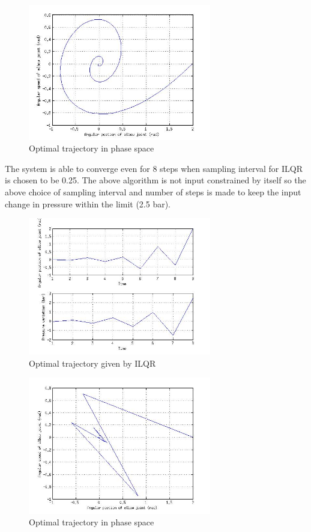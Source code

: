 \documentclass[conference]{IEEEtran}
\begin{document}
\begin{figure}[ht!]
\centering
\includegraphics[width=80mm]{ilqrphaseresponse2.jpg}
\caption{Optimal trajectory in phase space \label{Optimal trajectory phase space}}
\end{figure}
 
The system is able to converge even for 8 steps when sampling interval for ILQR is chosen to be 0.25.
The above algorithm is not input constrained by itself so the above choice of sampling interval and number of steps is made to keep the input change in pressure within the limit (2.5 bar). 
\begin{figure}[ht!]
\centering
\includegraphics[width=80mm]{ilqrresponse1.jpg}
\caption{Optimal trajectory given by ILQR \label{Optimal trajectory}}
\end{figure}

\begin{figure}[ht!]
\centering
\includegraphics[width=80mm]{ilqrphaseresponse1.jpg}
\caption{Optimal trajectory in phase space \label{Optimal trajectory}}
\end{figure}
\end{document}
